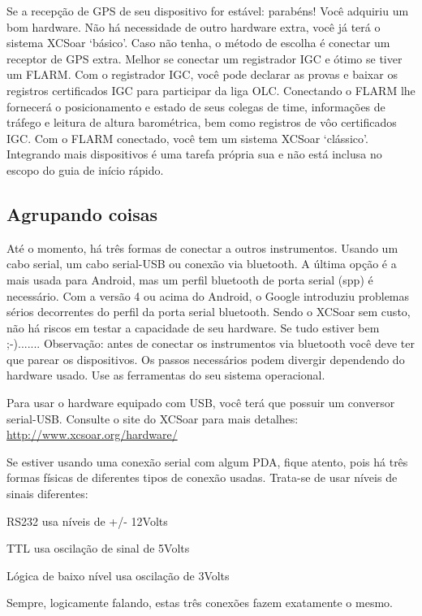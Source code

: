 \documentclass[a4paper,12pt,utf8]{scrreprt}
\begin{document}
Se a recepção de GPS de seu dispositivo for estável: parabéns!  Você adquiriu um bom hardware.  Não há necessidade de outro hardware extra, você já terá o sistema XCSoar ‘básico’.  Caso não tenha, o método de escolha é conectar um receptor de GPS extra.  Melhor se conectar um registrador IGC e ótimo se tiver um FLARM.  Com o registrador IGC, você pode declarar as provas e baixar os registros certificados IGC para participar da liga OLC.  Conectando o FLARM lhe fornecerá o posicionamento e estado de seus colegas de time, informações de tráfego e leitura de altura barométrica, bem como registros de vôo certificados IGC.  Com o FLARM conectado, você tem um sistema XCSoar ‘clássico’.  Integrando mais dispositivos é uma tarefa própria sua e não está inclusa no escopo do guia de início rápido.

\subsection{\textcolor{flashblue}{Agrupando coisas}}
Até o momento, há três formas de conectar a outros instrumentos.  Usando um cabo serial, um cabo serial-USB ou conexão via bluetooth.  A última opção é a mais usada para Android, mas um perfil bluetooth de porta serial (spp) é necessário.  Com a versão 4 ou acima do Android, o Google introduziu problemas sérios decorrentes do perfil da porta serial bluetooth.  Sendo o XCSoar sem custo, não há riscos em testar a capacidade de seu hardware.  Se tudo estiver bem ;-).......
Observação: antes de conectar os instrumentos via bluetooth você deve ter que parear os dispositivos.  Os passos necessários podem divergir dependendo do hardware usado.  Use as ferramentas do seu sistema operacional.

Para usar o hardware equipado com USB, você terá que possuir um conversor serial-USB.  Consulte o site do XCSoar para mais detalhes: {\url{http://www.xcsoar.org/hardware/}}

Se estiver usando uma conexão serial com algum PDA, fique atento, pois há três formas físicas de diferentes tipos de conexão usadas.  Trata-se de usar níveis de sinais diferentes:

\begin{compactitem}
\item RS232 usa níveis de +/- 12Volts
\item TTL usa oscilação de sinal de 5Volts
\item Lógica de baixo nível usa oscilação de 3Volts
\end{compactitem}
Sempre, logicamente falando, estas três conexões fazem exatamente o mesmo. 
\end{document}
